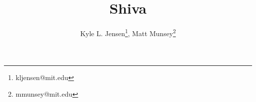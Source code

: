 

\title{Shiva}
\author{Kyle L. Jensen\thanks{kljensen@mit.edu}, Matt Munsey\thanks{mmunsey@mit.edu}}

\maketitle
